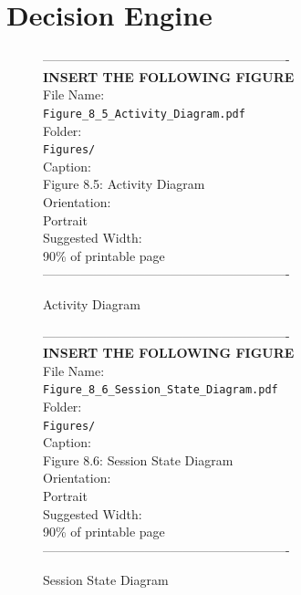\documentclass[12pt, a4paper]{report}
\begin{document}
\section{Decision Engine}
\vspace{1em}
\begin{figure}[htbp]
\begin{center}
----------------------------------------------------------\\
\vspace{0.5em}
\textbf{INSERT THE FOLLOWING FIGURE}\\
\vspace{1em}
File Name:\\
\texttt{Figure\_8\_5\_Activity\_Diagram.pdf}\\
\vspace{1em}
Folder:\\
\texttt{Figures/}\\
\vspace{1em}
Caption:\\
Figure 8.5: Activity Diagram\\
\vspace{1em}
Orientation:\\
Portrait\\
\vspace{1em}
Suggested Width:\\
90\% of printable page\\
\vspace{3cm}
----------------------------------------------------------
\end{center}
\caption{Activity Diagram}
\label{fig:diag_8}
\end{figure}
\vspace{1em}
\begin{figure}[htbp]
\begin{center}
----------------------------------------------------------\\
\vspace{0.5em}
\textbf{INSERT THE FOLLOWING FIGURE}\\
\vspace{1em}
File Name:\\
\texttt{Figure\_8\_6\_Session\_State\_Diagram.pdf}\\
\vspace{1em}
Folder:\\
\texttt{Figures/}\\
\vspace{1em}
Caption:\\
Figure 8.6: Session State Diagram\\
\vspace{1em}
Orientation:\\
Portrait\\
\vspace{1em}
Suggested Width:\\
90\% of printable page\\
\vspace{3cm}
----------------------------------------------------------
\end{center}
\caption{Session State Diagram}
\label{fig:diag_9}
\end{figure}
\end{document}
